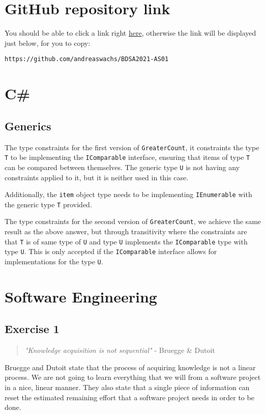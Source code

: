 \documentclass[12pt,letterpaper]{article}
\begin{document}
\section{GitHub repository link}

You should be able to click a link right \href{https://github.com/andreaswachs/BDSA2021-AS01}{here}, 
otherwise the link will be displayed just below, for you to copy:

\lstinline{https://github.com/andreaswachs/BDSA2021-AS01}


\section{C\#}
\subsection{Generics}
The type constraints for the first version of \lstinline{GreaterCount}, it constraints the type
\lstinline{T} to be implementing the \lstinline{IComparable} interface, ensuring that items of type \lstinline{T}
can be compared between themselves. The generic type \lstinline{U} is not having any constraints applied to it,
but it is neither used in this case. 

Additionally, the \lstinline{item} object type needs to be implementing \lstinline{IEnumerable} with the 
generic type \lstinline{T} provided.

The type constraints for the second version of \lstinline{GreaterCount}, we achieve the same result as the above answer,
but through transitivity where the constraints are that \lstinline{T} is of same type of \lstinline{U} and type \lstinline{U} 
implements the \lstinline{IComparable} type with type \lstinline{U}. This is only accepted if the \lstinline{IComparable} interface
allows for implementations for the type \lstinline{U}.

\section{Software Engineering}
\subsection{Exercise 1}

\begin{quote}
  \textit{"Knowledge acquisition is not sequential"} - Bruegge \& Dutoit  
\end{quote}

Bruegge and Dutoit state that the process of acquiring knowledge is not a linear process.
We are not going to learn everything that we will from a software project in a nice, linear manner.
They also state that a single piece of information can reset the estimated remaining effort
that a software project needs in order to be done.
\end{document}
